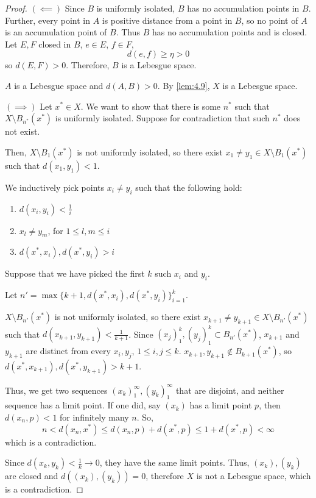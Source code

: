 \documentclass[openany, amssymb, psamsfonts]{amsart}
\let\fullref\autoref
\theoremstyle{definition}
\numberwithin{equation}{section}
\begin{document}
\begin{proof}
  $(\impliedby)$ Since $B$ is uniformly isolated, $B$ has no accumulation points in $B$. Further, every point in $A$ is positive distance from a point in $B$, so no point of $A$ is an accumulation point of $B$. Thus $B$ has no accumulation points and is closed. Let $E,F$ closed in $B$, $e \in E$, $f \in F$, 
  $$d(e,f) \ge \eta > 0$$ so $d(E,F) > 0$. Therefore, $B$ is a Lebesgue space. 

  $A$ is a Lebesgue space and $d(A,B) > 0$. By \fullref{lem:4.9}, $X$ is a Lebesgue space. 

  $(\implies)$ Let $x^\ast \in X$. We want to show that there is some $n^\ast$ such that $X \setminus B_{n^\ast}(x^\ast)$ is uniformly isolated. Suppose for contradiction that such $n^\ast$ does not exist. 

  Then, $X \setminus B_1(x^\ast)$ is not uniformly isolated, so there exist $x_1\neq y_1 \in X \setminus B_1(x^\ast)$ such that $d(x_1, y_1) < 1$. 

  We inductively pick points $x_i \neq y_i$ such that the following hold:
  \begin{enumerate}
    \item $d(x_i, y_i) < \frac1{i}$
    \item $x_l \neq y_m$, for $1\le l, m \le i$
    \item $d(x^\ast, x_i), d(x^\ast, y_i) > i$
  \end{enumerate}
  Suppose that we have picked the first $k$ such $x_i$ and $y_i$. 

  Let $n' = \max \{k+1, d(x^\ast, x_i), d(x^\ast, y_i)\}_{i=1}^k$. 

  $X \setminus B_{n'}(x^\ast)$ is not uniformly isolated, so there exist $x_{k+1} \neq y_{k+1}\in X \setminus B_{n'}(x^\ast)$ such that $d(x_{k+1}, y_{k+1}) < \frac1{k+1}$. Since $(x_j)_1^k, (y_j)_1^k \subset B_{n'}(x^\ast)$, $x_{k+1}$ and $y_{k+1}$ are distinct from every $x_i, y_j$, $1 \le i, j \le k$. $x_{k+1}, y_{k+1} \not\in B_{k+1}(x^\ast)$, so $d(x^\ast, x_{k+1}), d(x^\ast, y_{k+1}) > k+1$. 

  Thus, we get two sequences $(x_k)_1^\infty, (y_k)_1^\infty$ that are disjoint, and neither sequence has a limit point. If one did, say $(x_k)$ has a limit point $p$, then $d(x_n, p) < 1$ for infinitely many $n$. So, 
  $$n < d(x_n, x^\ast) \le d(x_n, p) + d(x^\ast, p) \le 1 + d(x^\ast, p) < \infty$$ which is a contradiction. 

  Since $d(x_k, y_k) < \frac1{k} \to 0$, they have the same limit points. Thus, $(x_k), (y_k)$ are closed and $d((x_k), (y_k)) = 0$, therefore $X$ is not a Lebesgue space, which is a contradiction. 


\end{proof}
\end{document}
